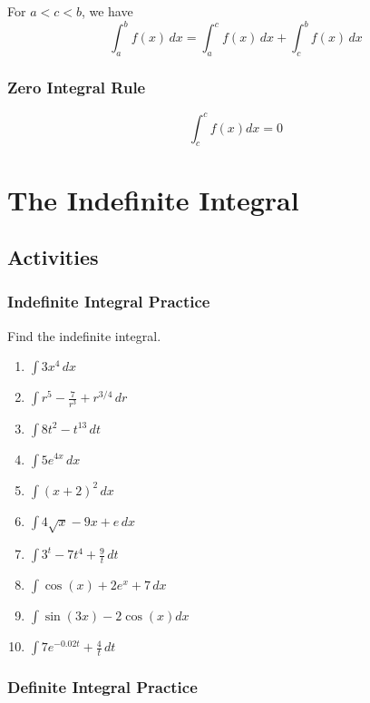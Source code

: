 \documentclass[
]{book}
\providecommand{\tightlist}{%
  \setlength{\itemsep}{0pt}\setlength{\parskip}{0pt}}
\begin{document}
For \(a < c < b\), we have
\[ \int_a^b f(x) \, dx = \int_a^c f(x) \, dx + \int_c^b f(x) \, dx\]

\hypertarget{zero-integral-rule}{%
\subsection{Zero Integral Rule}\label{zero-integral-rule}}

\[\int_c^c f(x) dx = 0\]

\hypertarget{the-indefinite-integral}{%
\chapter{The Indefinite Integral}\label{the-indefinite-integral}}

\hypertarget{activities-23}{%
\section{Activities}\label{activities-23}}

\hypertarget{indefinite-integral-practice}{%
\subsection{Indefinite Integral Practice}\label{indefinite-integral-practice}}

Find the indefinite integral.

\begin{enumerate}
\def\labelenumi{\arabic{enumi}.}
\tightlist
\item
  \(\displaystyle{\int 3x^4\,dx}\)
\item
  \(\displaystyle{\int r^5-\frac{7}{r^3}+r^{3/4}\,dr}\)
\item
  \(\displaystyle{\int 8t^2-t^{13}\,dt}\)
\item
  \(\displaystyle{\int 5e^{4x}\,dx}\)
\item
  \(\displaystyle{\int(x+2)^2\,dx}\)
\item
  \(\displaystyle{\int 4\sqrt{x}-9x+e\,dx}\)
\item
  \(\displaystyle{\int 3^t-7t^4 +\frac{9}{t}\,dt}\)
\item
  \(\displaystyle{\int \cos(x)+2e^x +7\,dx}\)
\item
  \(\displaystyle{\int \sin(3x)-2\cos(x)dx}\)
\item
  \(\displaystyle{\int 7e^{-0.02t}+\frac{4}{t}\,dt}\)
\end{enumerate}

\hypertarget{definite-integral-practice}{%
\subsection{Definite Integral Practice}\label{definite-integral-practice}}
\end{document}
